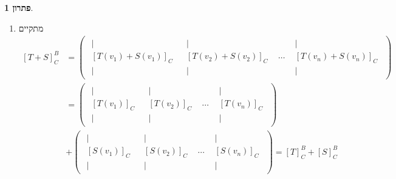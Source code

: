\documentclass[12pt]{report}
\theoremstyle{plain}
\theoremstyle{definition}
\newtheorem*{solution}{פתרון}
\newcommand{\0}{\mathbf{0}}
\begin{document}
\begin{solution}
\begin{enumerate}[label=\alph*.]
נסמן
$B=\Set{v_1,...,v_n}$.
\item 
מתקיים
$$
\begin{aligned}
[T+S]_C^B&=\begin{pmatrix}
\begin{array}{c}
|\\[-0.4ex]
[T(v_1)+S(v_1)]_C\\[-0.4ex]
|
\end{array}
&
\begin{array}{c}
|\\[-0.4ex]
[T(v_2)+S(v_2)]_C\\[-0.4ex]
|
\end{array}
&
\cdots
&
\begin{array}{c}
|\\[-0.4ex]
[T(v_n)+S(v_n)]_C\\[-0.4ex]
|
\end{array}
\end{pmatrix}\\
&=\begin{pmatrix}
\begin{array}{c}
|\\[-0.4ex]
[T(v_1)]_C\\[-0.4ex]
|
\end{array}
&
\begin{array}{c}
|\\[-0.4ex]
[T(v_2)]_C\\[-0.4ex]
|
\end{array}
&
\cdots
&
\begin{array}{c}
|\\[-0.4ex]
[T(v_n)]_C\\[-0.4ex]
|
\end{array}
\end{pmatrix} \\
&+\begin{pmatrix}
\begin{array}{c}
|\\[-0.4ex]
[S(v_1)]_C\\[-0.4ex]
|
\end{array}
&
\begin{array}{c}
|\\[-0.4ex]
[S(v_2)]_C\\[-0.4ex]
|
\end{array}
&
\cdots
&
\begin{array}{c}
|\\[-0.4ex]
[S(v_n)]_C\\[-0.4ex]
|
\end{array}
\end{pmatrix}=[T]_C^B+[S]_C^B
\end{aligned}
$$


\end{enumerate}
\end{solution}
\end{document}
